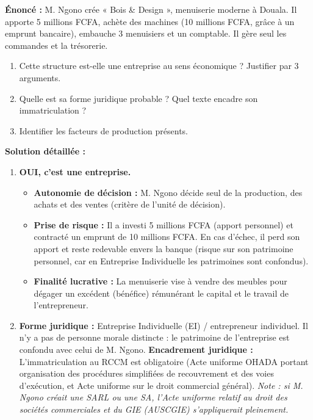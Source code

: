 \documentclass[11pt]{article}
\newcommand{\cle}[1]{{\popxbold\color{popdark}#1}}
\begin{document}
\begin{exoresolu}
    \textbf{Énoncé :} M. Ngono crée « Bois \& Design », menuiserie moderne à Douala. Il apporte 5 millions FCFA, achète des machines (10 millions FCFA, grâce à un emprunt bancaire), embauche 3 menuisiers et un comptable. Il gère seul les commandes et la trésorerie.
    \begin{enumerate}
        \item Cette structure est-elle une entreprise au sens économique ? Justifier par 3 arguments.
        \item Quelle est sa forme juridique probable ? Quel texte encadre son immatriculation ?
        \item Identifier les facteurs de production présents.
    \end{enumerate}
    \tcblower
    \textbf{Solution détaillée :}
    \begin{enumerate}
        \item \textbf{OUI, c'est une entreprise.}
              \begin{itemize}
                  \item \textbf{Autonomie de décision :} M. Ngono décide seul de la production, des achats et des ventes (critère de l'unité de décision).
                  \item \textbf{Prise de risque :} Il a investi 5 millions FCFA (apport personnel) et contracté un emprunt de 10 millions FCFA. En cas d'échec, il perd son apport et reste redevable envers la banque (risque sur son patrimoine personnel, car en Entreprise Individuelle les patrimoines sont confondus).
                  \item \textbf{Finalité lucrative :} La menuiserie vise à vendre des meubles pour dégager un excédent (bénéfice) rémunérant le capital et le travail de l'entrepreneur.
              \end{itemize}
        \item \textbf{Forme juridique :} \cle{Entreprise Individuelle (EI)} / entrepreneur individuel. Il n'y a pas de personne morale distincte : le patrimoine de l'entreprise est confondu avec celui de M. Ngono.
              \textbf{Encadrement juridique :} L'immatriculation au \cle{RCCM} est obligatoire (Acte uniforme OHADA portant organisation des procédures simplifiées de recouvrement et des voies d'exécution, et Acte uniforme sur le droit commercial général). \emph{Note : si M. Ngono créait une SARL ou une SA, l'Acte uniforme relatif au droit des sociétés commerciales et du GIE (AUSCGIE) s'appliquerait pleinement.}

\end{enumerate}
\end{exoresolu}
\end{document}

